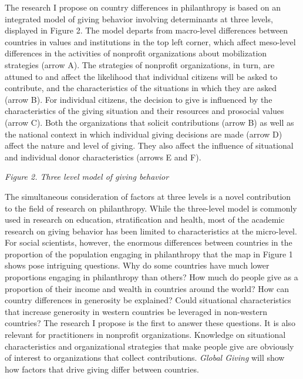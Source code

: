 \documentclass[twocolumn, serif, rga, numeric]{jote-article}
\begin{document}
The research I propose on country differences in philanthropy is based on an integrated model of giving behavior involving determinants at three levels, displayed in Figure 2.\cite{Penner2005} The model departs from macro-level differences between countries in values and institutions in the top left corner, which affect meso-level differences in the activities of nonprofit organizations about mobilization strategies (arrow A). The strategies of nonprofit organizations, in turn, are attuned to and affect the likelihood that individual citizens will be asked to contribute, and the characteristics of the situations in which they are asked (arrow B). For individual citizens, the decision to give is influenced by the characteristics of the giving situation and their resources and prosocial values (arrow C). Both the organizations that solicit contributions (arrow B) as well as the national context in which individual giving decisions are made (arrow D) affect the nature and level of giving. They also affect the influence of situational and individual donor characteristics (arrows E and F).


\emph{Figure 2. Three level model of giving behavior}

The simultaneous consideration of factors at three levels is a novel contribution to the field of research on philanthropy. While the three-level model is commonly used in research on education, stratification and health, most of the academic research on giving behavior has been limited to characteristics at the micro-level.\cite{Bekkers2007a, Bekkers2007} For social scientists, however, the enormous differences between countries in the proportion of the population engaging in philanthropy that the map in Figure 1 shows pose intriguing questions. Why do some countries have much lower proportions engaging in philanthropy than others? How much do people give as a proportion of their income and wealth in countries around the world? How can country differences in generosity be explained? Could situational characteristics that increase generosity in western countries be leveraged in non-western countries? The research I propose is the first to answer these questions. It is also relevant for practitioners in nonprofit organizations. Knowledge on situational characteristics and organizational strategies that make people give are obviously of interest to organizations that collect contributions.
\emph{Global Giving} will show how factors that drive giving differ between countries.
\end{document}
